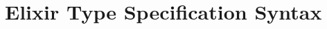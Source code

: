 \documentclass{article}
\begin{document}
\section{Elixir Type Specification Syntax}


\end{document}
